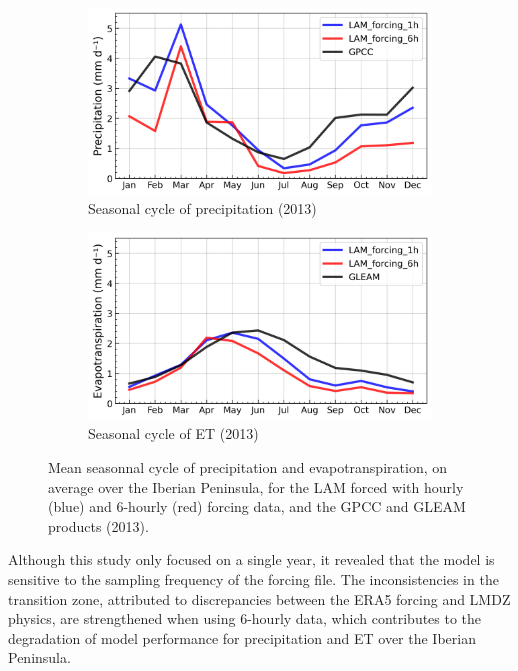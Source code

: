 \begin{figure}[htbp]
    \centering
    \begin{subfigure}[b]{0.49\textwidth}
        \caption{Seasonal cycle of precipitation (2013)}
        \includegraphics[width=\textwidth]{images/chap4/forcing_sampling_freq/IP_seasonal_cycle_precip.png}
    \end{subfigure}
    \begin{subfigure}[b]{0.49\textwidth}
        \caption{Seasonal cycle of ET (2013)}
        \includegraphics[width=\textwidth]{images/chap4/forcing_sampling_freq/IP_seasonal_cycle_evap.png}
    \end{subfigure}
    \caption{Mean seasonnal cycle of precipitation and evapotranspiration, on average over the Iberian Peninsula, for the LAM forced with hourly (blue) and 6-hourly (red) forcing data, and the GPCC and GLEAM products (2013).}
    \label{fig:forcing_sampling_freq_SC}
\end{figure}

Although this study only focused on a single year, it revealed that the model is sensitive to the sampling frequency of the forcing file. The inconsistencies in the transition zone, attributed to discrepancies between the ERA5 forcing and LMDZ physics, are strengthened when using 6-hourly data, which contributes to the degradation of model performance for precipitation and ET over the Iberian Peninsula.

\clearpage
